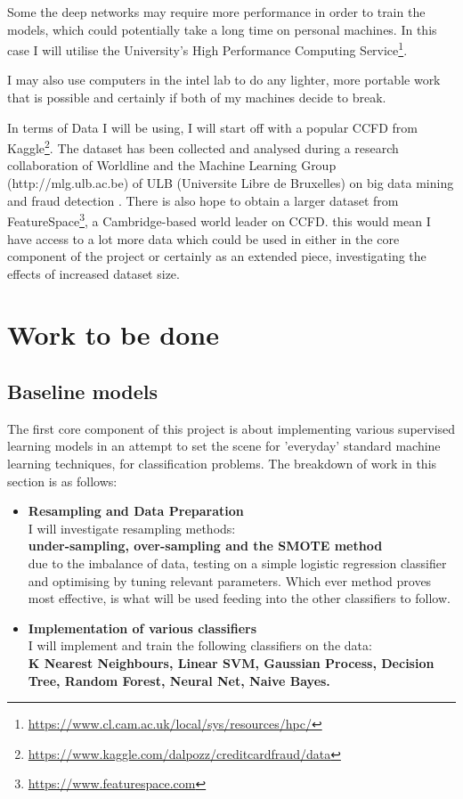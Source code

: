 \documentclass[12pt,a4paper,twoside]{article}
\begin{document}
Some the deep networks may require more performance in order to train the models, which could potentially take a long time on personal machines. In this case I will utilise the University's High Performance Computing Service\footnote{\href{https://www.cl.cam.ac.uk/local/sys/resources/hpc/}{https://www.cl.cam.ac.uk/local/sys/resources/hpc/}}.

I may also use computers in the intel lab to do any lighter, more portable work that is possible and certainly if both of my machines decide to break.

In terms of Data I will be using, I will start off with a popular CCFD from Kaggle\footnote{\href{https://www.kaggle.com/dalpozz/creditcardfraud/data}{https://www.kaggle.com/dalpozz/creditcardfraud/data}}. The dataset has been collected and analysed during a research collaboration of Worldline and the Machine Learning Group (http://mlg.ulb.ac.be) of ULB (Universite Libre de Bruxelles) on big data mining and fraud detection \cite{dal2015calibrating}.  There is also hope to obtain a larger dataset from FeatureSpace\footnote{\href{https://www.featurespace.com}{https://www.featurespace.com}}, a Cambridge-based world leader on CCFD. this would mean I have access to a lot more data which could be used in either in the core component of the project or certainly as an extended piece, investigating the effects of increased dataset size.

\pagebreak
\section*{Work to be done}
\subsection*{Baseline models}
The first core component of this project is about implementing various supervised learning models in an attempt to set the scene for 'everyday' standard machine learning techniques, for classification problems.
The breakdown of work in this section is as follows:

\begin{itemize}
\item
	\textbf{Resampling and Data Preparation} \\
	I will investigate resampling methods: \\ \textbf{under-sampling, over-sampling and the SMOTE method} \\ due to the imbalance of data, testing on a simple logistic regression classifier and optimising by tuning relevant parameters. Which ever method proves most effective, is what will be used feeding into the other classifiers to follow.

\item
	\textbf{Implementation of various classifiers} \\
	I will implement and train the following classifiers on the data: \\
	\textbf{K Nearest Neighbours, Linear SVM, Gaussian Process, Decision Tree, Random Forest, Neural Net, Naive Bayes.}

\end{itemize}
\end{document}

